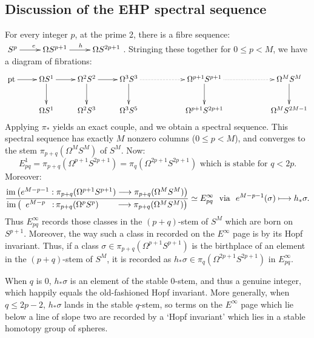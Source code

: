 \documentclass[11pt]{article}
\newcommand{\myheading}[1]
{{\noindent\Large #1}

}
\renewcommand{\myheading}[1]{\subsection{#1}}
\begin{document}
\begin{discussion of EHP SS}
\myheading{Discussion of the EHP spectral sequence}
For every integer $p$, at the prime 2, there is a fibre sequence: $\xymatrix{S^p\ar[r]^e&\Omega S^{p+1}\ar[r]^h& \Omega S^{2p+1}}$. Stringing these together for $0\leq p<M$, we have a diagram of fibrations:
\[\xymatrix{
\textup{pt}\ar[r]&\Omega S^1\ar[d]\ar[r]&\Omega^2 S^2\ar[d]\ar[r]&\Omega^3 S^3\ar[d]\ar@{.>}[rr]&&\Omega^{p+1}S^{p+1}\ar[d]\ar@{.>}[rr]&&\Omega^{M}S^{M}\ar[d]\\
&\Omega S^1&\Omega^2 S^3& \Omega^3S^5&&\Omega^{p+1} S^{2p+1}&&\Omega^{M}S^{2M-1}
}\]
Applying $\pi_*$ yields an exact couple, and we obtain a spectral sequence. This spectral sequence has exactly $M$ nonzero columns ($0\leq p <M$), and converges to the stem $\pi_{p+q}(\Omega^{M}S^{M})$ of $S^{M}$. Now:
\[E_{pq}^1=\pi_{p+q}(\Omega^{p+1}S^{2p+1})=\pi_q (\Omega^{2p+1}S^{2p+1})\text{ which is stable for $q< 2p$}.\]
Moreover:
\[
\frac{\im\left(e^{M-p-1}:\pi_{p+q}(\Omega^{p+1}S^{p+1})\to\pi_{p+q}(\Omega^MS^M)\right)}
{\im\left(\phantom{e^{M-p-1}:}\makebox[0cm][r]{$e^{M-p}\,\ :$}
\,\makebox[0cm][l]{$\pi_{p+q}(\Omega^{p}S^{p})$}\phantom{\pi_{p+q}(\Omega^{p+1}S^{p+1})}
\to\pi_{p+q}(\Omega^MS^M)\right)}\simeq E_{pq}^\infty\text{\ \ via \ }e^{M-p-1}(\sigma)\mapsto h_*\sigma.\]%
Thus $E^\infty_{pq}$ records those classes in the $(p+q)$-stem of $S^M$ which are born on $S^{p+1}$. Moreover, the way such a class in recorded on the $E^\infty$ page is by its Hopf invariant. Thus, if a class $\sigma\in\pi_{p+q}(\Omega^{p+1}S^{p+1})$ is the birthplace of an element in the $(p+q)$-stem of $S^M$, it is recorded as $h_*\sigma\in\pi_q({\Omega^{2p+1}S^{2p+1}})$ in $E^\infty_{pq}$.

When $q$ is $0$, $h_*\sigma$ is an element of the stable $0$-stem, and thus a genuine integer, which happily equals the old-fashioned Hopf invariant. More generally, when $q\leq 2p-2$, $h_*\sigma$ lands in the stable $q$-stem, so terms on the $E^\infty$ page which lie below a line of slope two are recorded by a `Hopf invariant' which lies in a stable homotopy group of spheres.
\end{discussion of EHP SS}
\end{document}
